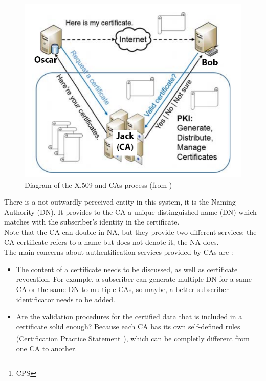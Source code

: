 \documentclass[journal, a4paper]{IEEEtran}
\begin{document}
\begin{figure}[!h]
	\begin{center}
		\includegraphics[scale=0.45]{pki.png}
		\caption{Diagram of the X.509 and CAs process (from \cite{wang2015domain})}
		\label{fig:pki}
	\end{center}
\end{figure}

There is a not outwardly perceived entity in this system, it is the Naming Authority (DN). It provides to the CA a unique distinguished name (DN) which matches with the subscriber's identity in the certificate.\\
Note that the CA can double in NA, but they provide two different services: the CA certificate refers to a name but does not denote it, the NA does.\\

The main concerns about authentification services provided by CAs are :

\begin{itemize}
	\item The content of a certificate needs to be discussed, as well as certificate revocation. For example, a subscriber can generate multiple DN for a same CA or the same DN to multiple CAs, so maybe, a better subscriber identificator needs to be added.
	\item Are the validation procedures for the certified data that is included in a certificate solid enough? Because each CA has its own self-defined rules (Certification Practice Statement\footnote{CPS}), which can be completly different from one CA to another.
\end{itemize}
\end{document}
